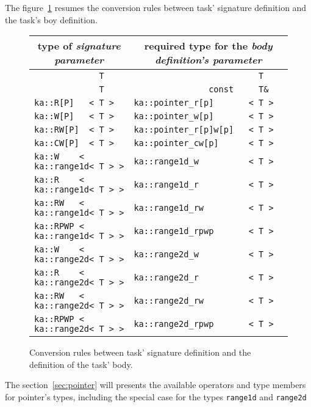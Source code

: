The figure~\ref{fig:task_signature} resumes the conversion rules between task' signature definition and the task's boy definition.
\begin{figure}[htbp]
\begin{center}
\begin{tabular}[t]{|l|l|}\hline
\multicolumn{1}{|c|}{type of {\em signature parameter}} &
\multicolumn{1}{|c|}{required type for the {\em body definition's parameter}} \\\hline
\verb!             T  ! & \verb!                         T  !\\\hline
\verb!             T  ! & \verb!               const     T&  !\\\hline
 \hline
\verb!ka::R[P]   < T >! & \verb!ka::pointer_r[p]       < T >!\\\hline
\verb!ka::W[P]   < T >! & \verb!ka::pointer_w[p]       < T >!\\\hline
\verb!ka::RW[P]  < T >! & \verb!ka::pointer_r[p]w[p]   < T >!\\\hline
\verb!ka::CW[P]  < T >! & \verb!ka::pointer_cw[p]      < T >!\\\hline\hline

\verb!ka::W    < ka::range1d< T > >! & \verb!ka::range1d_w          < T >!\\\hline
\verb!ka::R    < ka::range1d< T > >! & \verb!ka::range1d_r          < T >!\\\hline
\verb!ka::RW   < ka::range1d< T > >! & \verb!ka::range1d_rw         < T >!\\\hline
\verb!ka::RPWP < ka::range1d< T > >! & \verb!ka::range1d_rpwp       < T >!\\\hline\hline

\verb!ka::W    < ka::range2d< T > >! & \verb!ka::range2d_w          < T >!\\\hline
\verb!ka::R    < ka::range2d< T > >! & \verb!ka::range2d_r          < T >!\\\hline
\verb!ka::RW   < ka::range2d< T > >! & \verb!ka::range2d_rw         < T >!\\\hline
\verb!ka::RPWP < ka::range2d< T > >! & \verb!ka::range2d_rpwp       < T >!\\\hline
\end{tabular}
\end{center}
\caption{Conversion rules between task' signature definition and the definition of the task' body.}
\label{fig:task_signature}
\end{figure}
The section~\ref{sec:pointer} will presents the available operators and type members for pointer's types, including the special case for  the types \verb+range1d+ and \verb+range2d+

